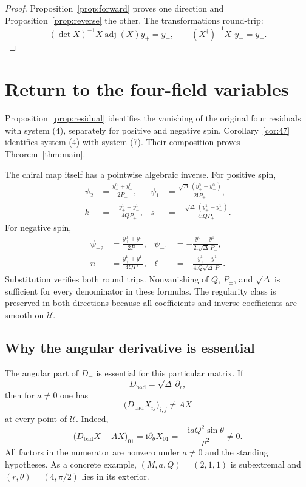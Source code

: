 \documentclass[11pt,a4paper]{article}
\numberwithin{equation}{section}
\theoremstyle{definition}
\theoremstyle{remark}
\newcommand{\I}{\mathrm i}
\newcommand{\adj}{\operatorname{adj}}
\newcommand{\Uext}{\mathcal U}
\begin{document}
\begin{proof}
Proposition~\ref{prop:forward} proves one direction and
Proposition~\ref{prop:reverse} the other.  The transformations round-trip:
\[
 (\det X)^{-1}X\adj(X)y_+=y_+,\qquad
 (X^\dagger)^{-1}X^\dagger y_-=y_-.
\]
\end{proof}

\section{Return to the four-field variables}
\label{sec:completion}

Proposition~\ref{prop:residual} identifies the vanishing of the original
four residuals with system (4), separately for positive and negative spin.
Corollary~\ref{cor:47} identifies system (4) with system (7).  Their
composition proves Theorem~\ref{thm:main}.

The chiral map itself has a pointwise algebraic inverse.  For positive
spin,
\begin{align}
 \psi_2&=\frac{y_+^0+y_-^0}{2P_+},&
 \psi_1&=\frac{\sqrt\Delta\,(y_+^0-y_-^0)}{2\I P_+},\label{eq:inverse-positive-a}\\
 k&=-\frac{y_+^1+y_-^1}{4QP_+},&
 s&=-\frac{\sqrt\Delta\,(y_+^1-y_-^1)}{4\I QP_+}.
\label{eq:inverse-positive-b}
\end{align}
For negative spin,
\begin{align}
 \psi_{-2}&=\frac{y_+^0+y_-^0}{2P_-},&
 \psi_{-1}&=-\frac{y_+^0-y_-^0}{2\I\sqrt\Delta\,P_-},\label{eq:inverse-negative-a}\\
 n&=\frac{y_+^1+y_-^1}{4QP_-},&
 \ell&=-\frac{y_+^1-y_-^1}{4\I Q\sqrt\Delta\,P_-}.
\label{eq:inverse-negative-b}
\end{align}
Substitution verifies both round trips.  Nonvanishing of \(Q\), \(P_\pm\),
and \(\sqrt\Delta\) is sufficient for every denominator in these formulas.
The regularity class is preserved in both directions because all
coefficients and inverse coefficients are smooth on \(\Uext\).

\subsection{Why the angular derivative is essential}

The angular part of \(D_-\) is essential for this particular matrix.
If
\[
 D_{\mathrm{bad}}=\sqrt\Delta\,\partial_r,
\]
then for \(a\neq0\) one has
\begin{equation}
 \bigl(D_{\mathrm{bad}}X_{ij}\bigr)_{i,j}\neq AX
\label{eq:bad-operator}
\end{equation}
at every point of \(\Uext\).  Indeed,
\[
 \bigl(D_{\mathrm{bad}}X-AX\bigr)_{01}
 =\I\partial_\theta X_{01}
 =-\frac{\I aQ^2\sin\theta}{\rho^2}\neq0.
\]
All factors in the numerator are nonzero under \(a\neq0\) and the
standing hypotheses.  As a concrete example, \((M,a,Q)=(2,1,1)\) is
subextremal and \((r,\theta)=(4,\pi/2)\) lies in its exterior.
\end{document}
